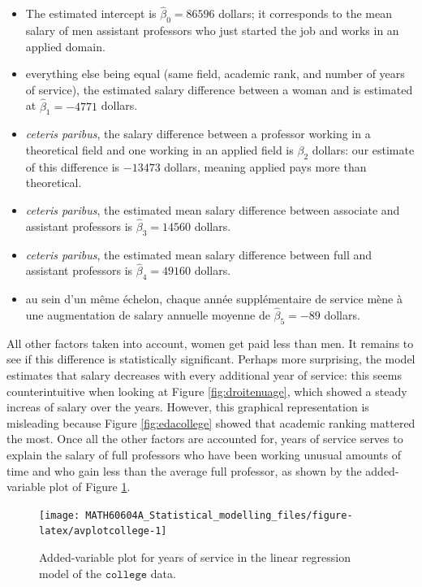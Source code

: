 \documentclass[
  11pt,
  letterpaper,
]{book}
\providecommand{\tightlist}{%
  \setlength{\itemsep}{0pt}\setlength{\parskip}{0pt}}
\theoremstyle{definition}
\theoremstyle{definition}
\theoremstyle{definition}
\theoremstyle{definition}
\theoremstyle{remark}
\begin{document}
\begin{itemize}
\tightlist
\item
  The estimated intercept is \(\widehat{\beta}_0=86596\) dollars; it corresponds to the mean salary of men assistant professors who just started the job and works in an applied domain.
\item
  everything else being equal (same field, academic rank, and number of years of service), the estimated salary difference between a woman and is estimated at \(\widehat{\beta}_1=-4771\) dollars.
\item
  \emph{ceteris paribus}, the salary difference between a professor working in a theoretical field and one working in an applied field is \(\beta_2\) dollars: our estimate of this difference is \(-13473\) dollars, meaning applied pays more than theoretical.
\item
  \emph{ceteris paribus}, the estimated mean salary difference between associate and assistant professors is \(\widehat{\beta}_3=14560\) dollars.
\item
  \emph{ceteris paribus}, the estimated mean salary difference between full and assistant professors is \(\widehat{\beta}_4=49160\) dollars.
\item
  au sein d'un même échelon, chaque année supplémentaire de service mène à une augmentation de salary annuelle moyenne de \(\widehat{\beta}_5=-89\) dollars.
\end{itemize}

All other factors taken into account, women get paid less than men. It remains to see if this difference is statistically significant. Perhaps more surprising, the model estimates that salary decreases with every additional year of service: this seems counterintuitive when looking at Figure \ref{fig:droitenuage}, which showed a steady increas of salary over the years. However, this graphical representation is misleading because Figure \ref{fig:edacollege} showed that academic ranking mattered the most. Once all the other factors are accounted for, years of service serves to explain the salary of full professors who have been working unusual amounts of time and who gain less than the average full professor, as shown by the added-variable plot of Figure \ref{fig:avplotcollege}.

\begin{figure}

{\centering \texttt{[image: MATH60604A\_Statistical\_modelling\_files/figure-latex/avplotcollege-1]} 

}

\caption{Added-variable plot for years of service in the linear regression model of the  $\texttt{college}$ data.}\label{fig:avplotcollege}
\end{figure}
\end{document}
